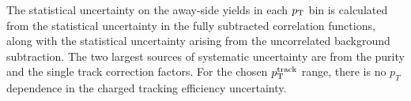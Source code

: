 \documentclass[ALICE,manyauthors]{cernphprep}
\newcommand{\pPb}          {\mbox{p--Pb}\xspace}
\newcommand{\pt}           {\ensuremath{p_{\rm T}}\xspace}
\begin{document}
The statistical uncertainty on the away-side yields in each $\pt$ bin is calculated from the statistical uncertainty in the fully subtracted correlation functions, along with the statistical uncertainty arising from the uncorrelated background subtraction. The two largest sources of systematic uncertainty are from the purity and the single track correction factors. For the chosen $\pt^{\mathrm{track}}$ range, there is no $p_T$ dependence in the charged tracking efficiency uncertainty. 



\end{document}
